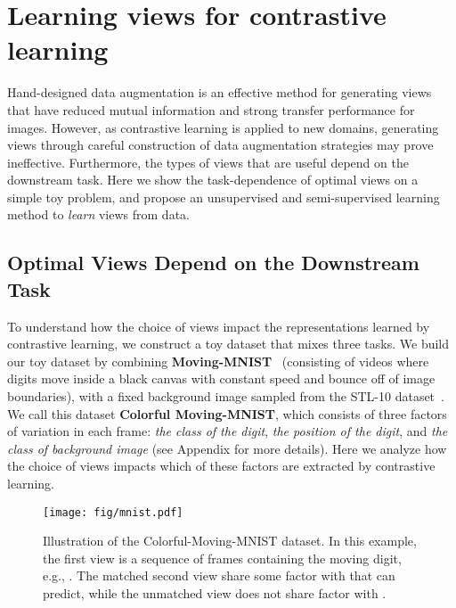 \documentclass{article}
\begin{document}
\section{Learning views for contrastive learning}
Hand-designed data augmentation is an effective method for generating views that have reduced mutual information and strong transfer performance for images. However, as contrastive learning is applied to new domains, generating views through careful construction of data augmentation strategies may prove ineffective. Furthermore, the types of views that are useful depend on the downstream task. Here we show the task-dependence of optimal views on a simple toy problem, and propose an unsupervised and semi-supervised learning method to \emph{learn} views from data.
\subsection{Optimal Views Depend on the Downstream Task}
To understand how the choice of views impact the representations learned by contrastive learning, we construct a toy dataset that mixes three tasks. We build our toy dataset by combining \textbf{Moving-MNIST}~\cite{srivastava2015unsupervised} (consisting of videos where digits move inside a black canvas with constant speed and bounce off of image boundaries), with a fixed background image sampled from the STL-10 dataset~\cite{coates2011analysis}. We call this dataset \textbf{Colorful Moving-MNIST}, which consists of three factors of variation in each frame: \emph{the class of the digit}, \emph{the position of the digit}, and \emph{the class of background image} (see Appendix for more details). Here we analyze how the choice of views impacts which of these factors are extracted by contrastive learning.

\begin{figure}[t]
\centering
\texttt{[image: fig/mnist.pdf]}
\caption{\small Illustration of the Colorful-Moving-MNIST dataset. In this example, the first view  is a sequence of frames containing the moving digit, e.g., . The matched second view  share some factor with  that  can predict, while the unmatched view  does not share factor with .}
\vspace{-10pt}
\label{fig:mnist}
\end{figure}
 
\end{document}
